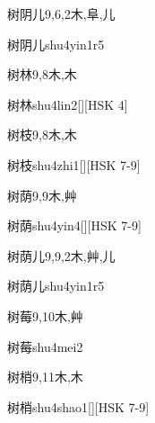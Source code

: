 \begin{Entry}{树阴儿}{9,6,2}{⽊,⾩,⼉}
  \begin{Phonetics}{树阴儿}{shu4yin1r5}
  \end{Phonetics}
\end{Entry}

\begin{Entry}{树林}{9,8}{⽊,⽊}
  \begin{Phonetics}{树林}{shu4lin2}[][HSK 4]
  \end{Phonetics}
\end{Entry}

\begin{Entry}{树枝}{9,8}{⽊,⽊}
  \begin{Phonetics}{树枝}{shu4zhi1}[][HSK 7-9]
  \end{Phonetics}
\end{Entry}

\begin{Entry}{树荫}{9,9}{⽊,⾋}
  \begin{Phonetics}{树荫}{shu4yin4}[][HSK 7-9]
  \end{Phonetics}
\end{Entry}

\begin{Entry}{树荫儿}{9,9,2}{⽊,⾋,⼉}
  \begin{Phonetics}{树荫儿}{shu4yin1r5}
  \end{Phonetics}
\end{Entry}

\begin{Entry}{树莓}{9,10}{⽊,⾋}
  \begin{Phonetics}{树莓}{shu4mei2}
  \end{Phonetics}
\end{Entry}

\begin{Entry}{树梢}{9,11}{⽊,⽊}
  \begin{Phonetics}{树梢}{shu4shao1}[][HSK 7-9]
  \end{Phonetics}
\end{Entry}

